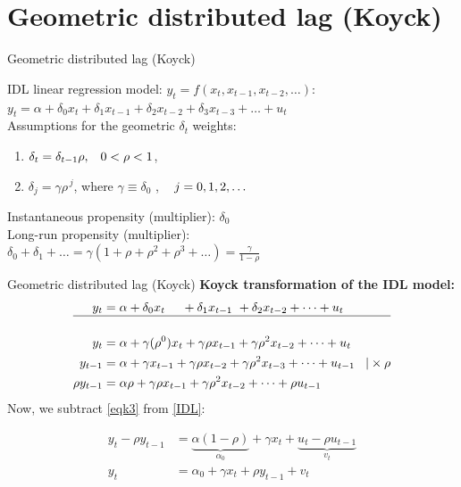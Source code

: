\documentclass{beamer}
\begin{document}
\section{Geometric distributed lag (Koyck) }
\begin{frame}{Geometric distributed lag (Koyck) }

IDL linear regression model: $y_t = f(x_t, x_{t-1}, x_{t-2}, \dots)$: 
\\ \vspace{0.3cm}
$ y_t = \alpha + \delta_0 x_t + \delta_1 x_{t-1} + \delta_2 x_{t-2} + \delta_3 x_{t-3} 
+ \dots + u_t$ \\ \vspace{0.3cm}
Assumptions for the geometric $\delta_t$ weights:
\begin{enumerate}
\item $\delta_t = \delta_{t-1}\rho, \hspace{0.3cm} 0 < \rho < 1 $,
\item $ \delta_{j} = \gamma \rho^{\,j}$, \hspace{0.3cm} where $\gamma \equiv \delta_0$ , $\hspace{0.3cm} j=0,1,2,\dots $
\end{enumerate}
 
\vspace{0.3cm}
Instantaneous propensity (multiplier): $ \delta_0$ 
\\ \vspace{0.3cm}
Long-run propensity (multiplier):
\\ \vspace{0.3cm}
$\delta_0+\delta_1+\dots=\gamma(1+\rho+\rho^2+\rho^3+\dots)=\frac{\gamma}{1-\rho}$

\end{frame}
\begin{frame}{Geometric distributed lag (Koyck) }
\textbf{Koyck transformation of the IDL model:}
\begin{align} 
y_t & = \alpha + \delta_0 x_t \,\,\,\,\,\,\,\, + \delta_1 x_{t-1} \,\,+ \delta_2 x_{t-2} + \dots + u_t \notag \\
\hline \notag \\ 
y_t & = \alpha + \gamma (\rho^0) x_t + \gamma\rho x_{t-1} + \gamma\rho^2 x_{t-2}+\dots + u_t \label{IDL} \\ 
y_{t-1} & = \alpha + \gamma x_{t-1} + \gamma\rho x_{t-2} + \gamma\rho^2 x_{t-3} + \dots+u_{t-1} \hspace{0.3cm} |\times \rho 
\\ \label{eqk3}
\rho y_{t-1} & = \alpha\rho + \gamma\rho x_{t-1} + \gamma \rho^2 x_{t-2} + \dots + \rho u_{t-1}
\end{align}
\centering Now, we subtract \eqref{eqk3} from \eqref{IDL}: \par
\begin{align}
y_t-\rho y_{t-1} & = \underbrace{\alpha(1-\rho)}_{\alpha_{0}}+\gamma x_t + \underbrace{u_t-\rho u_{t-1}}_{v_t}\\
y_t & = \alpha_0 + \gamma x_t + \rho y_{t-1} + v_t \label{Koyck}
\end{align}
\end{frame}
\end{document}

